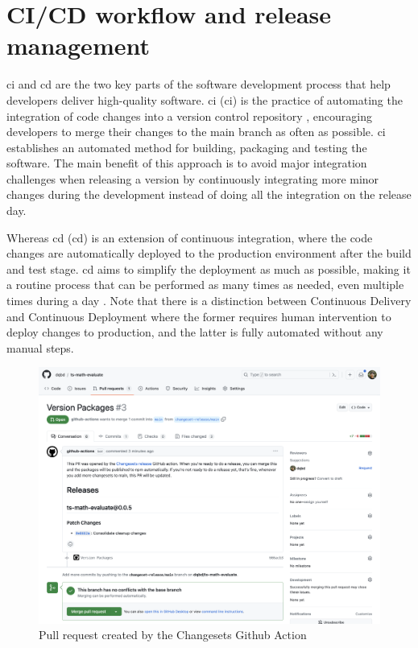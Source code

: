 \section{CI/CD workflow and release management}

\acrfull{ci} and \acrlong{cd} are the two key parts of the software development process that help developers deliver high-quality software. \acrlong{ci} (\acrshort{ci}) is the practice of automating the integration of code changes into a version control repository \cite{atlassianContinuousIntegrationVs}, encouraging developers to merge their changes to the main branch as often as possible. \acrshort{ci} establishes an automated method for building, packaging and testing the software. The main benefit of this approach is to avoid major integration challenges when releasing a version by continuously integrating more minor changes during the development instead of doing all the integration on the release day.

Whereas \acrlong{cd} (\acrshort{cd}) is an extension of continuous integration, where the code changes are automatically deployed to the production environment after the build and test stage. \acrshort{cd} aims to simplify the deployment as much as possible, making it a routine process that can be performed as many times as needed, even multiple times during a day \cite{WhatCICD}. Note that there is a distinction between Continuous Delivery and Continuous Deployment where the former requires human intervention to deploy changes to production, and the latter is fully automated without any manual steps.

\begin{figure}[ht]
  \centering
  \includegraphics[width=\textwidth]{text/testing/changesets-pull-request.png}
  \caption{Pull request created by the Changesets Github Action}
  \label{fig:changesets-pull-request}
\end{figure}

